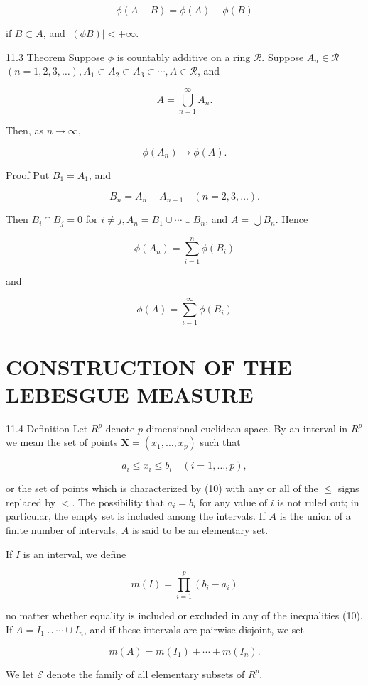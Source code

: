 \documentclass[10pt]{article}
\begin{document}
$$
\phi(A-B)=\phi(A)-\phi(B)
$$

if $B \subset A$, and $|(\phi B)|<+\infty$.

11.3 Theorem Suppose $\phi$ is countably additive on a ring $\mathscr{R}$. Suppose $A_{n} \in \mathscr{R}$ $(n=1,2,3, \ldots), A_{1} \subset A_{2} \subset A_{3} \subset \cdots, A \in \mathscr{R}$, and

$$
A=\bigcup_{n=1}^{\infty} A_{n} .
$$

Then, as $n \rightarrow \infty$,

$$
\phi\left(A_{n}\right) \rightarrow \phi(A) .
$$

Proof Put $B_{1}=A_{1}$, and

$$
B_{n}=A_{n}-A_{n-1} \quad(n=2,3, \ldots) .
$$

Then $B_{i} \cap B_{j}=0$ for $i \neq j, A_{n}=B_{1} \cup \cdots \cup B_{n}$, and $A=\bigcup B_{n}$. Hence

$$
\phi\left(A_{n}\right)=\sum_{i=1}^{n} \phi\left(B_{i}\right)
$$

and

$$
\phi(A)=\sum_{i=1}^{\infty} \phi\left(B_{i}\right)
$$

\section{CONSTRUCTION OF THE LEBESGUE MEASURE}
11.4 Definition Let $R^{p}$ denote $p$-dimensional euclidean space. By an interval in $R^{p}$ we mean the set of points $\mathbf{X}=\left(x_{1}, \ldots, x_{p}\right)$ such that

$$
a_{i} \leq x_{i} \leq b_{i} \quad(i=1, \ldots, p),
$$

or the set of points which is characterized by (10) with any or all of the $\leq$ signs replaced by $<$. The possibility that $a_{i}=b_{i}$ for any value of $i$ is not ruled out; in particular, the empty set is included among the intervals. If $A$ is the union of a finite number of intervals, $A$ is said to be an elementary set.

If $I$ is an interval, we define

$$
m(I)=\prod_{i=1}^{p}\left(b_{i}-a_{i}\right)
$$

no matter whether equality is included or excluded in any of the inequalities (10). If $A=I_{1} \cup \cdots \cup I_{n}$, and if these intervals are pairwise disjoint, we set

$$
m(A)=m\left(I_{1}\right)+\cdots+m\left(I_{n}\right) .
$$

We let $\mathscr{E}$ denote the family of all elementary subsets of $R^{p}$.
\end{document}
